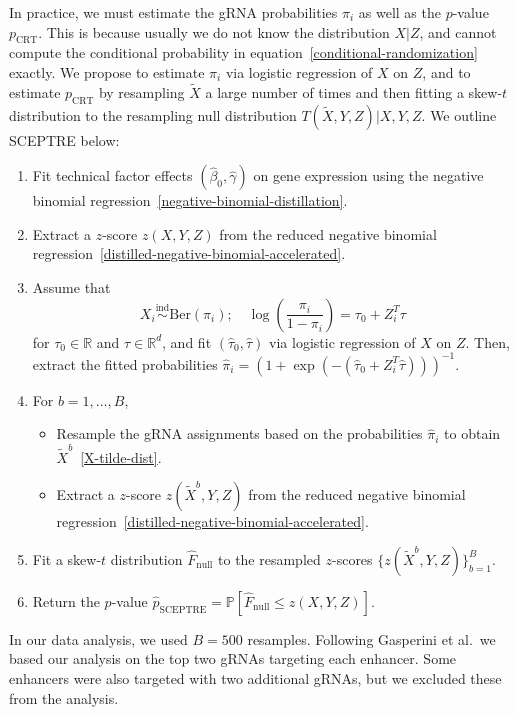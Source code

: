 \documentclass{nature}
\begin{document}
In practice, we must estimate the gRNA probabilities $\pi_i$ as well as the $p$-value $p_{\text{CRT}}$. This is because usually we do not know the distribution $X|Z$, and cannot compute the conditional probability in equation~\eqref{conditional-randomization} exactly. We propose to estimate $\pi_i$ via logistic regression of $X$ on $Z$, and to estimate $p_{\text{CRT}}$ by resampling $\widetilde X$ a large number of times and then fitting a skew-$t$ distribution to the resampling null distribution $T(\widetilde X, Y, Z)|X,Y,Z$. We outline SCEPTRE below: 
\begin{enumerate}
	\item Fit technical factor effects $(\widehat \beta_0,\widehat \gamma)$ on gene expression using the negative binomial regression~\eqref{negative-binomial-distillation}.
	\item Extract a $z$-score $z(X,Y,Z)$ from the reduced negative binomial regression~\eqref{distilled-negative-binomial-accelerated}.
	\item Assume that 
	\begin{equation}
	X_i \overset{\text{ind}}\sim \text{Ber}(\pi_i); \quad \log\left(\frac{\pi_i}{1-\pi_i}\right) = \tau_0 + Z_i^T \tau
	\label{logistic-regression}
	\end{equation}
	for $\tau_0 \in \mathbb R$ and $\tau \in \mathbb R^d$, and fit $(\widehat \tau_0, \widehat \tau)$ via logistic regression of $X$ on $Z$. Then, extract the fitted probabilities $\widehat \pi_i = (1+\exp(-(\widehat \tau_0 + Z_i^T \widehat \tau)))^{-1}$.	
	\item For $b = 1, \dots, B$,
	\begin{itemize}
		\item Resample the gRNA assignments based on the probabilities $\widehat \pi_i$ to obtain $\widetilde X^b$~\eqref{X-tilde-dist}.
		\item Extract a $z$-score $z(\widetilde X^b, Y, Z)$ from the reduced negative binomial regression~\eqref{distilled-negative-binomial-accelerated}.
	\end{itemize}
	\item Fit a skew-$t$ distribution $\widehat F_{\text{null}}$ to the resampled $z$-scores $\{z(\widetilde X^b, Y, Z)\}_{b = 1}^B$. 
	\item Return the $p$-value $\widehat p_{\text{SCEPTRE}} = \mathbb P[\widehat F_{\text{null}} \leq z(X,Y,Z)]$.
\end{enumerate}
In our data analysis, we used $B = 500$ resamples. Following Gasperini et al.\, we based our analysis on the top two gRNAs targeting each enhancer. Some enhancers were also targeted with two additional gRNAs, but we excluded these from the analysis.
\end{document}
